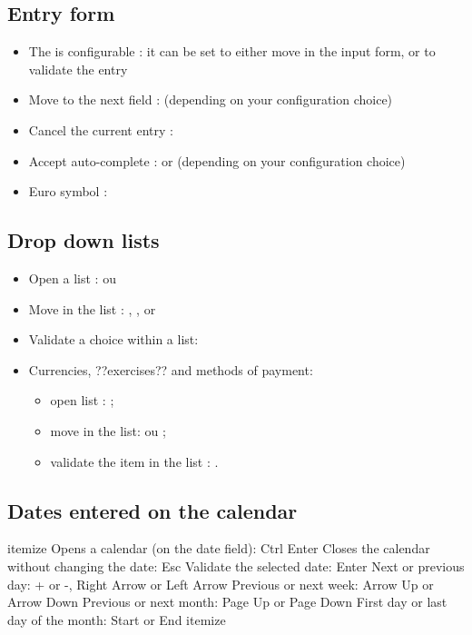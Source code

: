 \subsection{Entry form }

\begin{itemize}
	\item The  is configurable : it can be set to either move in the input form, or to validate the entry
	\item Move to the next field :  (depending on your configuration choice)
	\item Cancel the current entry : 
	\item Accept auto-complete :  or  (depending on your configuration choice)
	\item  Euro symbol : 
\end{itemize}

\subsection{Drop down lists}

\begin{itemize}
	 \item Open a list :  ou 
	 \item Move in the list : , ,  or 
	 \item Validate a choice within a list: 
	 \item Currencies, ??exercises?? and methods of payment:
		\begin{itemize}
			\item open list :  ; 
			\item move in the list:  ou  ;
			\item validate the item in the list : .
		\end{itemize}
\end{itemize}


\subsection{Dates entered on the calendar}

itemize
Opens a calendar (on the date field): Ctrl Enter
Closes the calendar without changing the date: Esc
Validate the selected date: Enter
Next or previous day: + or -, Right Arrow or Left Arrow
Previous or next week: Arrow Up or Arrow Down
Previous or next month: Page Up or Page Down
First day or last day of the month: Start or End
itemize

